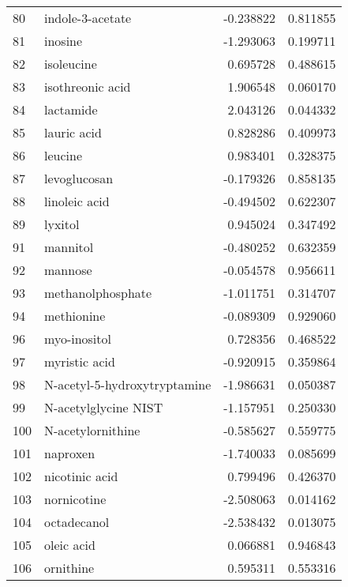\begin{tabular}{llrr}
80  &                   indole-3-acetate & -0.238822 &  0.811855 \\
81  &                            inosine & -1.293063 &  0.199711 \\
82  &                         isoleucine &  0.695728 &  0.488615 \\
83  &                   isothreonic acid &  1.906548 &  0.060170 \\
84  &                          lactamide &  2.043126 &  0.044332 \\
85  &                        lauric acid &  0.828286 &  0.409973 \\
86  &                            leucine &  0.983401 &  0.328375 \\
87  &                       levoglucosan & -0.179326 &  0.858135 \\
88  &                      linoleic acid & -0.494502 &  0.622307 \\
89  &                            lyxitol &  0.945024 &  0.347492 \\
91  &                           mannitol & -0.480252 &  0.632359 \\
92  &                            mannose & -0.054578 &  0.956611 \\
93  &                  methanolphosphate & -1.011751 &  0.314707 \\
94  &                         methionine & -0.089309 &  0.929060 \\
96  &                       myo-inositol &  0.728356 &  0.468522 \\
97  &                      myristic acid & -0.920915 &  0.359864 \\
98  &       N-acetyl-5-hydroxytryptamine & -1.986631 &  0.050387 \\
99  &               N-acetylglycine NIST & -1.157951 &  0.250330 \\
100 &                  N-acetylornithine & -0.585627 &  0.559775 \\
101 &                           naproxen & -1.740033 &  0.085699 \\
102 &                     nicotinic acid &  0.799496 &  0.426370 \\
103 &                        nornicotine & -2.508063 &  0.014162 \\
104 &                        octadecanol & -2.538432 &  0.013075 \\
105 &                         oleic acid &  0.066881 &  0.946843 \\
106 &                          ornithine &  0.595311 &  0.553316 \\

\end{tabular}
